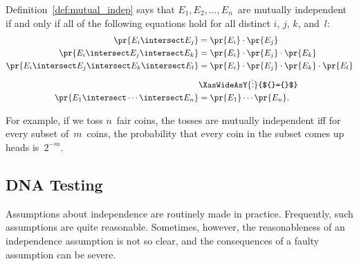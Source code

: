 \iffalse
The proof of Theorem~\ref{thm:16A2} uses induction and reasoning
similar to the proof of Theorem~\ref{thm:16A1}.  We will not include
the details here.
\fi

Definition~\ref{def:mutual_indep} says that $E_1, E_2, \dots, E_n$~are
mutually independent if and only if all of the following equations
hold for all distinct $i$, $j$, $k$, and~$l$:
%
\begin{align*}
\pr{E_i \intersect E_j}
    & = \pr{E_i} \cdot \pr{E_j}
 \\
\pr{E_i \intersect E_j \intersect E_k}
    & = \pr{E_i} \cdot \pr{E_j} \cdot \pr{E_k}
 \\
\pr{E_i \intersect E_j \intersect E_k \intersect E_l}
    & = \pr{E_i} \cdot \pr{E_j} \cdot \pr{E_k} \cdot \pr{E_l}
 \\
    & \XasWideAsY{\vdots}{${}={}$} \\
\pr{E_1 \intersect \cdots \intersect E_n} & = \pr{E_1} \cdots \pr{E_n}.
\end{align*}

For example, if we toss $n$~fair coins, the tosses are mutually
independent iff for every subset of~$m$~coins, the probability that
every coin in the subset comes up heads is~$2^{-m}$.

\subsection{DNA Testing}

Assumptions about independence are routinely made in practice.
Frequently, such assumptions are quite reasonable.  Sometimes,
however, the reasonableness of an independence assumption is not so
clear, and the consequences of a faulty assumption can be severe.

